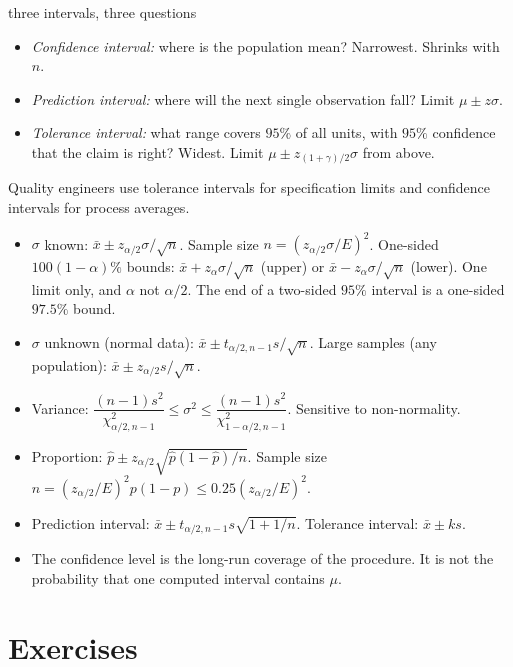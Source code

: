 \begin{interview}{three intervals, three questions}
\begin{itemize}
  \item \emph{Confidence interval:} where is the population mean? Narrowest. Shrinks with $n$.
  \item \emph{Prediction interval:} where will the next single observation fall? Limit $\mu\pm z\sigma$.
  \item \emph{Tolerance interval:} what range covers $95\%$ of all units, with $95\%$ confidence that the claim is right? Widest. Limit $\mu\pm z_{(1+\gamma)/2}\sigma$ from above.
\end{itemize}
Quality engineers use tolerance intervals for specification limits and confidence intervals for process averages.
\end{interview}

\begin{summarybox}
\begin{itemize}
  \item $\sigma$ known: $\bar{x}\pm z_{\alpha/2}\sigma/\sqrt n$. Sample size $n=(z_{\alpha/2}\sigma/E)^2$. One-sided $100(1-\alpha)\%$ bounds: $\bar{x}+z_\alpha\sigma/\sqrt n$ (upper) or $\bar{x}-z_\alpha\sigma/\sqrt n$ (lower). One limit only, and $\alpha$ not $\alpha/2$. The end of a two-sided $95\%$ interval is a one-sided $97.5\%$ bound.
  \item $\sigma$ unknown (normal data): $\bar{x}\pm t_{\alpha/2,n-1}s/\sqrt n$. Large samples (any population): $\bar{x}\pm z_{\alpha/2}s/\sqrt n$.
  \item Variance: $\dfrac{(n-1)s^2}{\chi^2_{\alpha/2,n-1}}\le\sigma^2\le\dfrac{(n-1)s^2}{\chi^2_{1-\alpha/2,n-1}}$. Sensitive to non-normality.
  \item Proportion: $\hat{p}\pm z_{\alpha/2}\sqrt{\hat{p}(1-\hat{p})/n}$. Sample size $n=(z_{\alpha/2}/E)^2p(1-p)\le0.25(z_{\alpha/2}/E)^2$.
  \item Prediction interval: $\bar{x}\pm t_{\alpha/2,n-1}s\sqrt{1+1/n}$. Tolerance interval: $\bar{x}\pm ks$.
  \item The confidence level is the long-run coverage of the procedure. It is not the probability that one computed interval contains $\mu$.
\end{itemize}
\end{summarybox}

\section{Exercises}

